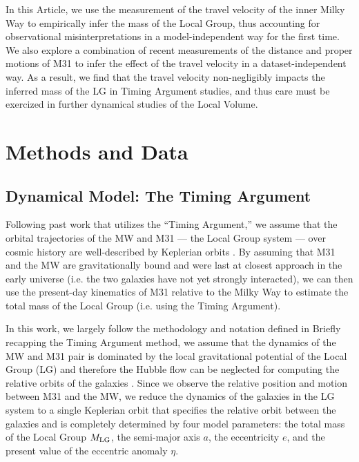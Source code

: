 \documentclass[twocolumn]{aastex631}
\newcommand{\mlg}{\ensuremath{M_{\rm LG}}}
\begin{document}
In this Article, we use the measurement of the travel velocity of the inner 
Milky Way to empirically infer the mass of the Local Group, thus accounting for 
observational misinterpretations in a model-independent way for the first time. 
We also explore a combination of recent measurements of the 
distance and proper motions of M31 to infer the effect of the travel velocity 
in a dataset-independent way. 
As a result, we find that the travel velocity non-negligibly impacts the 
inferred mass of the LG in Timing Argument studies, and thus care must be 
exercized in further dynamical studies of the Local Volume. 


\section{Methods and Data}

\subsection{Dynamical Model: The Timing Argument}
\label{sec:timingarg}

Following past work that utilizes the ``Timing Argument,'' we assume that the
orbital trajectories of the MW and M31 --- the Local Group system --- over
cosmic history are well-described by Keplerian orbits \citep[e.g.,][]{Kahn1959,
Lynden-Bell:1981, Kroeker1991, LiWhite2008, vdm2012, Penarrubia2016}.
By assuming that M31 and the MW are gravitationally bound and were last at
closest approach in the early universe (i.e. the two galaxies have not yet
strongly interacted), we can then use the present-day kinematics of M31 relative
to the Milky Way to estimate the total mass of the Local Group (i.e. using the
Timing Argument).

In this work, we largely follow the methodology and notation defined in
\citet{Penarrubia2016}
Briefly recapping the Timing Argument method, we assume that the dynamics of the
MW and M31 pair is dominated by the local gravitational potential of the Local Group
(LG) and therefore the Hubble flow can be neglected for computing the relative
orbits of the galaxies \citep[see, e.g.,][]{Penarrubia2014}.
Since we observe the relative position and motion between M31 and the MW, we
reduce the dynamics of the galaxies in the LG system to a single Keplerian orbit
that specifies the relative orbit between the galaxies and is completely
determined by four model parameters: the total mass of the Local Group \mlg, the
semi-major axis $a$, the eccentricity $e$, and the present value of the
eccentric anomaly $\eta$.
\end{document}
